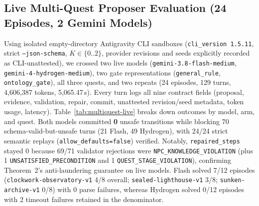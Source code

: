 \subsection{Live Multi-Quest Proposer Evaluation (24 Episodes, 2 Gemini Models)}\label{sec:multiquest-live}
Using isolated empty-directory Antigravity CLI sandboxes (\texttt{cli\_version~1.5.11}, strict \texttt{--json-schema}, $K{\in}\{0..2\}$, provider revisions and seeds explicitly recorded as CLI-unattested), we crossed two live models (\texttt{gemini-3.8-}\allowbreak\texttt{flash-}\allowbreak\texttt{medium}, \texttt{gemini-4-}\allowbreak\texttt{hydrogen-}\allowbreak\texttt{medium}), two gate representations (\texttt{general\_rule}, \texttt{ontology\_gate}), all three quests, and two repeats (24 episodes, 129 turns, 4,606,387 tokens, 5,065.47\,s). Every turn logs all nine contract fields (proposal, evidence, validation, repair, commit, unattested revision/seed metadata, token usage, latency). Table~\ref{tab:multiquest-live} breaks down outcomes by model, arm, and quest. Both models committed \textbf{0} unsafe transitions while blocking 70 schema-valid-but-unsafe turns (21 Flash, 49 Hydrogen), with 24/24 strict semantic replays (\texttt{allow\_defaults=false}) verified. Notably, \texttt{repaired\_steps} stayed $0$ because 69/71 validator rejections were \texttt{NPC\_}\allowbreak\texttt{KNOWLEDGE\_}\allowbreak\texttt{VIOLATION} (plus 1 \texttt{UNSATISFIED\_}\allowbreak\texttt{PRECONDITION} and 1 \texttt{QUEST\_}\allowbreak\texttt{STAGE\_}\allowbreak\texttt{VIOLATION}), confirming Theorem~2's anti-laundering guarantee on live models. Flash solved 7/12 episodes (\texttt{clockwork-observatory-v1} 4/8 overall; \texttt{sealed-lighthouse-v1} 3/8; \texttt{sunken-archive-v1} 0/8) with 0 parse failures, whereas Hydrogen solved 0/12 episodes with 2 timeout failures retained in the denominator.

